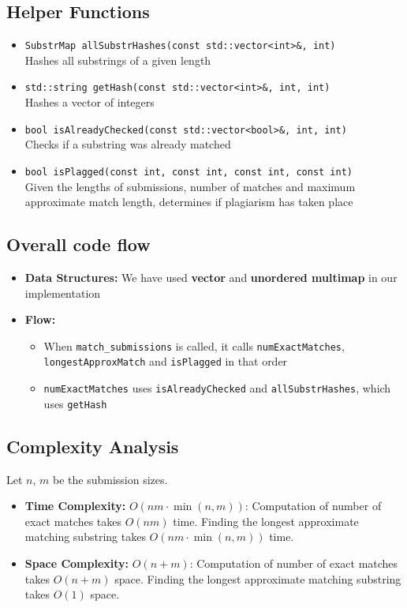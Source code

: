 \documentclass[12pt]{article}
\begin{document}
\subsection{Helper Functions}
\begin{itemize}[noitemsep]
    \item \texttt{SubstrMap allSubstrHashes(const std::vector<int>\&, int)} \\
    Hashes all substrings of a given length 
    \item \texttt{std::string getHash(const std::vector<int>\&, int, int)} \\
    Hashes a vector of integers
    \item \texttt{bool isAlreadyChecked(const std::vector<bool>\&, int, int)} \\
    Checks if a substring was already matched
    \item \texttt{bool isPlagged(const int, const int, const int, const int)} \\
    Given the lengths of submissions, number of matches and maximum approximate match length, determines if plagiarism has taken place
\end{itemize}

\subsection{Overall code flow}
\begin{itemize}[noitemsep]
     
    \item \textbf{Data Structures:} We have used \textbf{vector} and \textbf{unordered multimap} in our implementation
    \item \textbf{Flow:} \begin{itemize}
        \item When \texttt{match\_submissions} is called, it calls \texttt{numExactMatches}, \texttt{longestApproxMatch} and \texttt{isPlagged} in that order
        \item \texttt{numExactMatches} uses \texttt{isAlreadyChecked} and \texttt{allSubstrHashes}, which uses \texttt{getHash}
    \end{itemize}
\end{itemize}

\subsection{Complexity Analysis}
Let $n$, $m$ be the submission sizes.
\begin{itemize}[noitemsep]
    \item \textbf{Time Complexity:} $O(nm\cdot\min(n, m))$: Computation of number of exact matches takes $O(nm)$ time. Finding the longest approximate matching substring takes $O(nm\cdot\min(n, m))$ time.
    \item \textbf{Space Complexity:} $O(n + m)$: Computation of number of exact matches takes $O(n + m)$ space. Finding the longest approximate matching substring takes $O(1)$ space.
\end{itemize}
\end{document}
